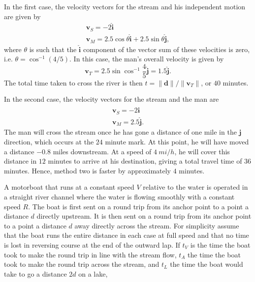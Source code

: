 \documentclass[../feynman-lectures-on-physics.tex]{subfiles}
\begin{document}
\begin{questions}
	\begin{solution}
		In the first case, the velocity vectors for the stream and his independent motion are
		given by
		\begin{gather*}
			\mathbf{v}_S = -2\hat{\mathbf{i}} \\
			\mathbf{v}_M = 2.5\cos\theta\hat{\mathbf{i}} + 2.5\sin\theta\hat{\mathbf{j}},
		\end{gather*}
		where $\theta$ is such that the $\hat{\mathbf{i}}$ component of the vector sum
		of these velocities is zero, i.e. $\theta = \cos^{-1}(4/5)$. In this case,
		the man's overall velocity is given by
		\[
		\mathbf{v}_T = 2.5\sin\cos^{-1}\frac{4}{5}\hat{\mathbf{j}} = 1.5\hat{\mathbf{j}}.
		\]
		The total time taken to cross the river is then $t =
		\|\mathbf{d}\|/\|\mathbf{v}_T\|$, or $40$ minutes.
		
		In the second case, the velocity vectors for the stream and the man are
		\begin{gather*}
			\mathbf{v}_S = -2\hat{\mathbf{i}} \\
			\mathbf{v}_M = 2.5\hat{\mathbf{j}}.
		\end{gather*}
		The man will cross the stream once he has gone a distance of one mile in the
		$\hat{\mathbf{j}}$ direction, which occurs at the $24$ minute mark. At this point, he will have moved a distance
		$-0.8$ miles downstream. At a speed of $\SI{4}{mi\per{h}}$, he will cover
		this distance in $12$ minutes to arrive at his destination, giving a total
		travel time of $36$ minutes. Hence, method two is faster by approximately
		$4$ minutes.
	\end{solution}
	
	\question A motorboat that runs at a constant speed $V$ relative to the water
	is operated in a straight river channel where the water is flowing smoothly
	with a constant speed $R$. The boat is first sent on a round trip from its
	anchor point to a point a distance $d$ directly upstream. It is then sent on
	a round trip from its anchor point to a point a distance $d$ away directly
	across the stream. For simplicity assume that the boat runs the entire
	distance in each case at full speed and that no time is lost in reversing
	course at the end of the outward lap. If $t_V$ is the time the boat took to
	make the round trip in line with the stream flow, $t_A$ the time the boat
	took to make the round trip across the stream, and $t_L$ the time the boat
	would take to go a distance $2d$ on a lake,
\end{questions}
\end{document}
